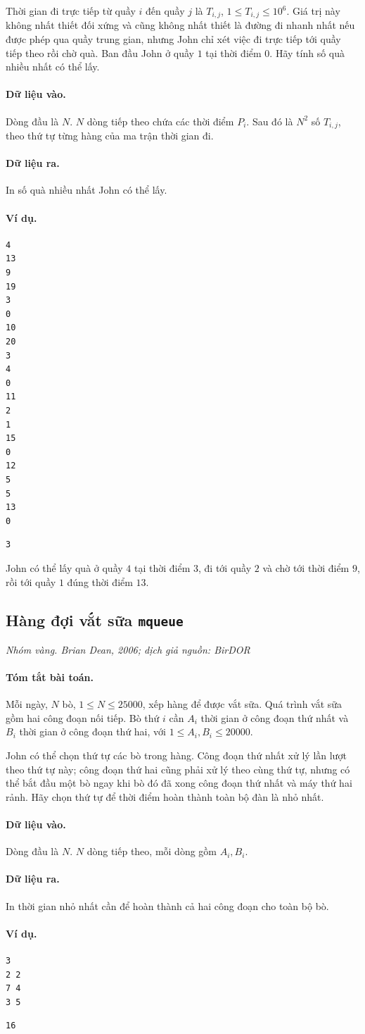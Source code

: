 \documentclass[11pt]{article}
\newcommand{\problem}[4]{%
  \subsection[#1 (#2)]{#1 \hfill {\normalsize\texttt{#2}}}%
  \noindent\textit{#3. #4}\par\smallskip
}
\newcommand{\iosec}[1]{\paragraph{#1}}
\begin{document}
Thời gian đi trực tiếp từ quầy \(i\) đến quầy \(j\) là \(T_{i,j}\),
\(1\le T_{i,j}\le 10^6\). Giá trị này không nhất thiết đối xứng và cũng không
nhất thiết là đường đi nhanh nhất nếu được phép qua quầy trung gian, nhưng
John chỉ xét việc đi trực tiếp tới quầy tiếp theo rồi chờ quà. Ban đầu John ở
quầy \(1\) tại thời điểm \(0\). Hãy tính số quà nhiều nhất có thể lấy.

\iosec{Dữ liệu vào.}
Dòng đầu là \(N\). \(N\) dòng tiếp theo chứa các thời điểm \(P_i\). Sau đó là
\(N^2\) số \(T_{i,j}\), theo thứ tự từng hàng của ma trận thời gian đi.

\iosec{Dữ liệu ra.}
In số quà nhiều nhất John có thể lấy.

\iosec{Ví dụ.}
\begin{verbatim}
4
13
9
19
3
0
10
20
3
4
0
11
2
1
15
0
12
5
5
13
0
\end{verbatim}

\begin{verbatim}
3
\end{verbatim}

John có thể lấy quà ở quầy \(4\) tại thời điểm \(3\), đi tới quầy \(2\) và
chờ tới thời điểm \(9\), rồi tới quầy \(1\) đúng thời điểm \(13\).

\problem{Hàng đợi vắt sữa}{mqueue}{Nhóm vàng}{Brian Dean, 2006; dịch giả nguồn: BirDOR}

\iosec{Tóm tắt bài toán.}
Mỗi ngày, \(N\) bò, \(1\le N\le 25000\), xếp hàng để được vắt sữa. Quá trình
vắt sữa gồm hai công đoạn nối tiếp. Bò thứ \(i\) cần \(A_i\) thời gian ở công
đoạn thứ nhất và \(B_i\) thời gian ở công đoạn thứ hai, với
\(1\le A_i,B_i\le 20000\).

John có thể chọn thứ tự các bò trong hàng. Công đoạn thứ nhất xử lý lần lượt
theo thứ tự này; công đoạn thứ hai cũng phải xử lý theo cùng thứ tự, nhưng có
thể bắt đầu một bò ngay khi bò đó đã xong công đoạn thứ nhất và máy thứ hai
rảnh. Hãy chọn thứ tự để thời điểm hoàn thành toàn bộ đàn là nhỏ nhất.

\iosec{Dữ liệu vào.}
Dòng đầu là \(N\). \(N\) dòng tiếp theo, mỗi dòng gồm \(A_i,B_i\).

\iosec{Dữ liệu ra.}
In thời gian nhỏ nhất cần để hoàn thành cả hai công đoạn cho toàn bộ bò.

\iosec{Ví dụ.}
\begin{verbatim}
3
2 2
7 4
3 5
\end{verbatim}

\begin{verbatim}
16
\end{verbatim}
\end{document}
